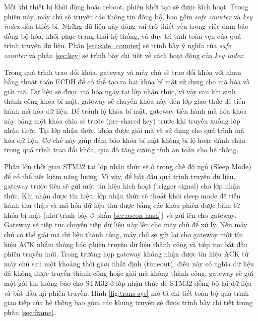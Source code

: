 Mỗi khi thiết bị khởi động hoặc reboot, phiên khởi tạo sẽ được kích hoạt. Trong phiên này, máy chủ sẽ truyền các thông tin đồng bộ, bao gồm \textit{safe counter} và \textit{key index} đến thiết bị. Những dữ liệu này đóng vai trò thiết yếu trong việc đảm bảo đồng bộ hóa, khôi phục trạng thái hệ thống, và duy trì tính toàn vẹn của quá trình truyền dữ liệu. Phần \ref{sec:safe_counter} sẽ trình bày ý nghĩa của \textit{safe counter} và phần \ref{sec:key} sẽ trình bày chi tiết về cách hoạt động của \textit{key index}.

Trong quá trình trao đổi khóa, gateway và máy chủ sẽ trao đổi khóa với nhau bằng thuật toán ECDH để có thể tạo ra hai khóa bí mật sử dụng cho mã hóa và giải mã. Dữ liệu sẽ được mã hóa ngay tại lớp nhận thức, vì vậy sau khi sinh thành công khóa bí mật, gateway sẽ chuyển khóa này đến lớp giao thức để tiến hành mã hóa dữ liệu. Để tránh lộ khóa bí mật, gateway tiến hành mã hóa khóa này bằng một khóa chia sẻ trước (pre-shared key) trước khi truyền xuống lớp nhận thức. Tại lớp nhận thức, khóa được giải mã và sử dụng cho quá trình mã hóa dữ liệu. Cơ chế này giúp đảm bảo khóa bí mật không bị lộ hoặc đánh chặn trong quá trình trao đổi khóa, qua đó tăng cường tính an toàn cho hệ thống.

Phần lớn thời gian STM32 tại lớp nhận thức sẽ ở trong chế độ ngủ (Sleep Mode) để có thể tiết kiệm năng lượng. Vì vậy, để bắt đầu quá trình truyền dữ liệu, gateway trước tiên sẽ gửi một tín hiệu kích hoạt (trigger signal) cho lớp nhận thức. Khi nhận được tín hiệu, lớp nhận thức sẽ thoát khỏi sleep mode để tiến hành thu thập và mã hóa dữ liệu thu được bằng các khóa phiên được băm từ khóa bí mật (như trình bày ở phần \ref{sec:ascon-hash}) và gửi lên cho gateway. Gateway sẽ tiếp tục chuyển tiếp dữ liệu này lên cho máy chủ để xử lý. Nếu máy chủ có thể giải mã dữ liệu thành công, máy chủ sẽ gửi lại cho gateway một tín hiệu ACK nhằm thông báo phiên truyền dữ liệu thành công và tiếp tục bắt đầu phiên truyền mới. Trong trường hợp gateway không nhận được tín hiệu ACK từ máy chủ sau một khoảng thời gian nhất định (timeout), điều này có nghĩa dữ liệu đã không được truyền thành công hoặc giải mã không thành công, gateway sẽ gửi một gói tin thông báo cho STM32 ở lớp nhận thức để STM32 đồng bộ lại dữ liệu và bắt đầu lại phiên truyền. Hình \ref{fig:trans-sys} mô tả chi tiết toàn bộ quá trình giao tiếp của hệ thống bao gồm các khung truyền sẽ được trình bày chi tiết trong phần \ref{sec:frame}.


